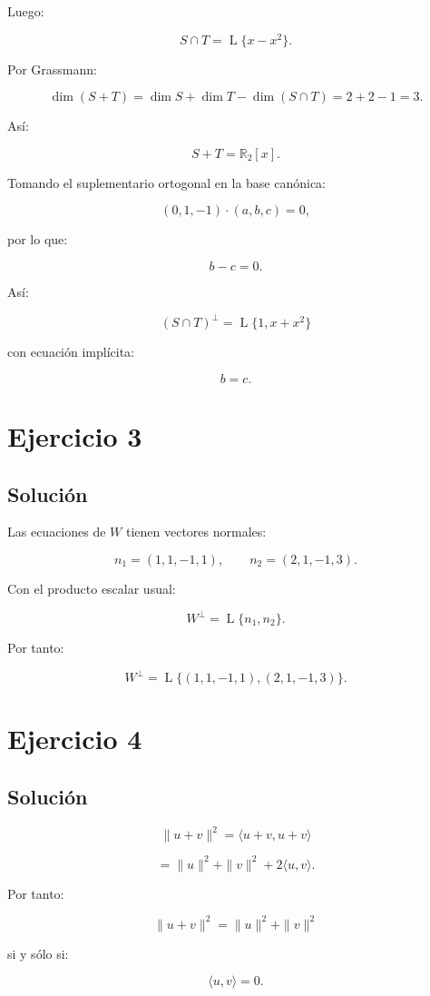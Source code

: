\documentclass[11pt,a4paper]{article}
\newcommand{\R}{\mathbb{R}}
\newcommand{\Span}{\operatorname{L}}
\begin{document}
Luego:

\[
\boxed{
S\cap T
=
\Span\{x-x^2\}.
}
\]

Por Grassmann:

\[
\dim(S+T)
=
\dim S+\dim T-\dim(S\cap T)
=
2+2-1=3.
\]

Así:

\[
\boxed{
S+T=\R_2[x].
}
\]

Tomando el suplementario ortogonal en la base canónica:

\[
(0,1,-1)\cdot(a,b,c)=0,
\]

por lo que:

\[
b-c=0.
\]

Así:

\[
\boxed{
(S\cap T)^\perp
=
\Span\{1,x+x^2\}
}
\]

con ecuación implícita:

\[
\boxed{b=c.}
\]

\section{Ejercicio 3}
\subsection{Solución}

Las ecuaciones de $W$ tienen vectores normales:

\[
n_1=(1,1,-1,1),
\qquad
n_2=(2,1,-1,3).
\]

Con el producto escalar usual:

\[
W^\perp
=
\Span\{n_1,n_2\}.
\]

Por tanto:

\[
\boxed{
W^\perp
=
\Span\{(1,1,-1,1),(2,1,-1,3)\}.
}
\]

\section{Ejercicio 4}
\subsection{Solución}

\[
\|u+v\|^2
=
\langle u+v,u+v\rangle
\]

\[
=
\|u\|^2+\|v\|^2+2\langle u,v\rangle.
\]

Por tanto:

\[
\|u+v\|^2
=
\|u\|^2+\|v\|^2
\]

si y sólo si:

\[
\boxed{\langle u,v\rangle=0.}
\]
\end{document}
